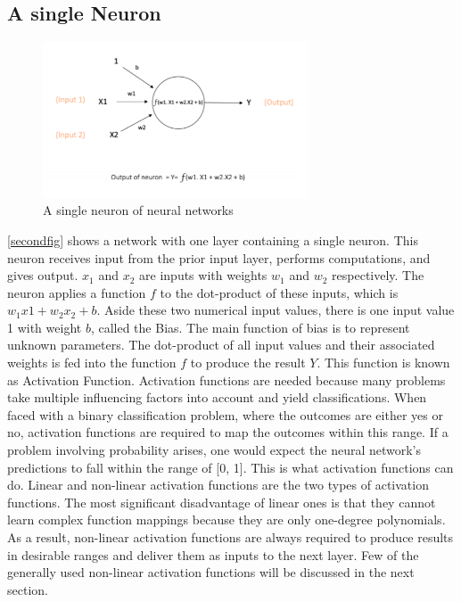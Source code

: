 \documentclass[a4paper,11pt,oneside]{book}
\begin{document}
\subsection{A single Neuron}
\begin{figure}[!h]
	\centering
	\includegraphics[width=0.7\textwidth]{figures/neuron}
	\caption{A single neuron of neural networks}
	\label{secondfig}
\end{figure}

\autoref{secondfig} shows a network with one layer containing a single neuron. This neuron receives input from the prior input layer, performs computations, and gives output. $x_1$ and $x_2$ are inputs with weights $w_1$ and $w_2$ respectively. The neuron applies a function $f$ to the dot-product of these inputs, which is $w_{1}x{1}+w_{2}x_{2}+b$.  Aside these two numerical input values, there is one input value 1 with weight $b$, called the Bias. The main function of bias is to represent unknown parameters. The dot-product of all input values and their associated weights is fed into the function $f$ to produce the result $Y$.
This function is known as Activation Function.\newline\newline
Activation functions are needed because many problems take multiple influencing factors into account and yield classifications. When faced with a binary classification problem, where the outcomes are either yes or no, activation functions are required to map the outcomes within this range. If a problem involving probability arises, one would expect the neural network's predictions to fall within the range of [0, 1]. This is what activation functions can do.\newline\newline
Linear and non-linear activation functions are the two types of activation functions. The most significant disadvantage of linear ones is that they cannot learn complex function mappings because they are only one-degree polynomials. As a result, non-linear activation functions are always required to produce results in desirable ranges and deliver them as inputs to the next layer. Few of the generally used non-linear activation functions will be discussed in the next section.
\end{document}
